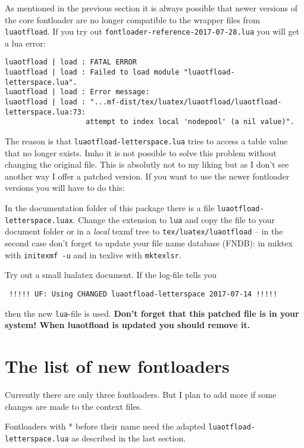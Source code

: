 \documentclass[parskip=half-,egregdoesnotlikesansseriftitles]{scrartcl}
\newcommand\package[1]{\texttt{#1}}
\begin{document}
As mentioned in the previous section it is always possible that newer versions of the core fontloader are no longer compatible to the wrapper files from \package{luaotfload}. If you try out \texttt{fontloader-reference-2017-07-28.lua} you will get a lua error:

\begin{verbatim}
luaotfload | load : FATAL ERROR
luaotfload | load : Failed to load module "luaotfload-letterspace.lua".
luaotfload | load : Error message:
luaotfload | load : "...mf-dist/tex/luatex/luaotfload/luaotfload-letterspace.lua:73: 
                   attempt to index local 'nodepool' (a nil value)".
\end{verbatim}

The reason is that \texttt{luaotfload-letterspace.lua} tries to access a table value that no longer exists. Imho it is not possible to solve this problem without changing the original file. This is absolutly not to my liking but as I don't see another way I offer a patched version. If you want to use the newer fontloader versions you will have to do this:

In the documentation folder of this package there is a file \texttt{luaotfload-letterspace.luax}. Change the extension to \texttt{lua} and copy the file to your document folder or in a \emph{local} texmf tree to \texttt{tex/luatex/luaotfload} -- in the second case don't forget to update your file name database (FNDB): in miktex with \texttt{initexmf -u} and in texlive with \texttt{mktexlsr}.

Try out a small lualatex document. If the log-file tells you

\verb+ !!!!! UF: Using CHANGED luaotfload-letterspace 2017-07-14 !!!!!+

then the new \texttt{lua}-file is used. \textbf{Don't forget that this patched file is in your system! When luaotfload is updated you should remove it.}

\section{The list of new fontloaders}

Currently there are only three fontloaders. But I plan to add more if some changes are made to the context files.

Fontloaders with * before their name need the adapted \texttt{luaotfload-letterspace.lua} as described in the last section.
\end{document}
